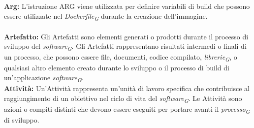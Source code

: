 \documentclass{article}
\begin{document}
\\
\\
\textbf{Arg:} L’istruzione ARG viene utilizzata per definire variabili di build che possono essere utilizzate nel \textit{Dockerfile}\textsubscript{\textit{G}} durante la creazione dell'immagine. 
\\
\\
\textbf{Artefatto:} Gli Artefatti sono elementi generati o prodotti durante il processo di sviluppo del \textit{software}\textsubscript{\textit{G}}. Gli Artefatti rappresentano risultati intermedi o finali di un processo, che possono essere file, documenti, codice compilato, \textit{librerie}\textsubscript{\textit{G}}, o qualsiasi altro elemento creato durante lo sviluppo o il processo di build di un'applicazione \textit{software}\textsubscript{\textit{G}}.
\pagebreak
\\
\textbf{Attività:} Un'Attività rappresenta un'unità di lavoro specifica che contribuisce al raggiungimento di un obiettivo nel ciclo di vita del \textit{software}\textsubscript{\textit{G}}. Le Attività sono azioni o compiti distinti che devono essere eseguiti per portare avanti il \textit{processo}\textsubscript{\textit{G}} di sviluppo.
\\
\\
\pagebreak
\end{document}
